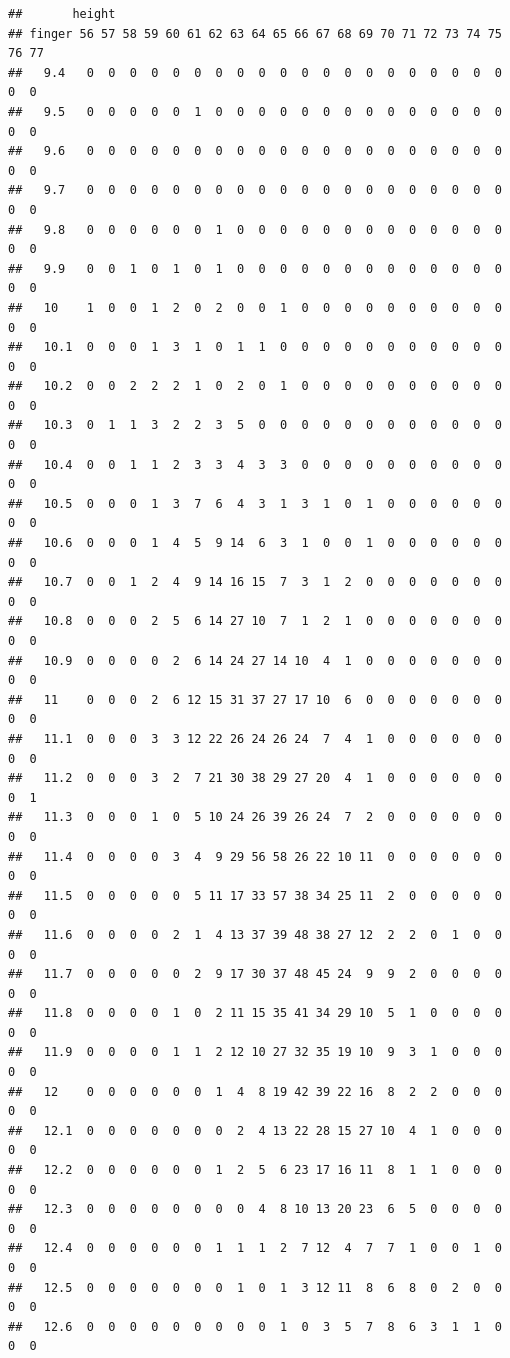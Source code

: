 \documentclass[
]{article}
\begin{document}
\begin{verbatim}
##       height
## finger 56 57 58 59 60 61 62 63 64 65 66 67 68 69 70 71 72 73 74 75 76 77
##   9.4   0  0  0  0  0  0  0  0  0  0  0  0  0  0  0  0  0  0  0  0  0  0
##   9.5   0  0  0  0  0  1  0  0  0  0  0  0  0  0  0  0  0  0  0  0  0  0
##   9.6   0  0  0  0  0  0  0  0  0  0  0  0  0  0  0  0  0  0  0  0  0  0
##   9.7   0  0  0  0  0  0  0  0  0  0  0  0  0  0  0  0  0  0  0  0  0  0
##   9.8   0  0  0  0  0  0  1  0  0  0  0  0  0  0  0  0  0  0  0  0  0  0
##   9.9   0  0  1  0  1  0  1  0  0  0  0  0  0  0  0  0  0  0  0  0  0  0
##   10    1  0  0  1  2  0  2  0  0  1  0  0  0  0  0  0  0  0  0  0  0  0
##   10.1  0  0  0  1  3  1  0  1  1  0  0  0  0  0  0  0  0  0  0  0  0  0
##   10.2  0  0  2  2  2  1  0  2  0  1  0  0  0  0  0  0  0  0  0  0  0  0
##   10.3  0  1  1  3  2  2  3  5  0  0  0  0  0  0  0  0  0  0  0  0  0  0
##   10.4  0  0  1  1  2  3  3  4  3  3  0  0  0  0  0  0  0  0  0  0  0  0
##   10.5  0  0  0  1  3  7  6  4  3  1  3  1  0  1  0  0  0  0  0  0  0  0
##   10.6  0  0  0  1  4  5  9 14  6  3  1  0  0  1  0  0  0  0  0  0  0  0
##   10.7  0  0  1  2  4  9 14 16 15  7  3  1  2  0  0  0  0  0  0  0  0  0
##   10.8  0  0  0  2  5  6 14 27 10  7  1  2  1  0  0  0  0  0  0  0  0  0
##   10.9  0  0  0  0  2  6 14 24 27 14 10  4  1  0  0  0  0  0  0  0  0  0
##   11    0  0  0  2  6 12 15 31 37 27 17 10  6  0  0  0  0  0  0  0  0  0
##   11.1  0  0  0  3  3 12 22 26 24 26 24  7  4  1  0  0  0  0  0  0  0  0
##   11.2  0  0  0  3  2  7 21 30 38 29 27 20  4  1  0  0  0  0  0  0  0  1
##   11.3  0  0  0  1  0  5 10 24 26 39 26 24  7  2  0  0  0  0  0  0  0  0
##   11.4  0  0  0  0  3  4  9 29 56 58 26 22 10 11  0  0  0  0  0  0  0  0
##   11.5  0  0  0  0  0  5 11 17 33 57 38 34 25 11  2  0  0  0  0  0  0  0
##   11.6  0  0  0  0  2  1  4 13 37 39 48 38 27 12  2  2  0  1  0  0  0  0
##   11.7  0  0  0  0  0  2  9 17 30 37 48 45 24  9  9  2  0  0  0  0  0  0
##   11.8  0  0  0  0  1  0  2 11 15 35 41 34 29 10  5  1  0  0  0  0  0  0
##   11.9  0  0  0  0  1  1  2 12 10 27 32 35 19 10  9  3  1  0  0  0  0  0
##   12    0  0  0  0  0  0  1  4  8 19 42 39 22 16  8  2  2  0  0  0  0  0
##   12.1  0  0  0  0  0  0  0  2  4 13 22 28 15 27 10  4  1  0  0  0  0  0
##   12.2  0  0  0  0  0  0  1  2  5  6 23 17 16 11  8  1  1  0  0  0  0  0
##   12.3  0  0  0  0  0  0  0  0  4  8 10 13 20 23  6  5  0  0  0  0  0  0
##   12.4  0  0  0  0  0  0  1  1  1  2  7 12  4  7  7  1  0  0  1  0  0  0
##   12.5  0  0  0  0  0  0  0  1  0  1  3 12 11  8  6  8  0  2  0  0  0  0
##   12.6  0  0  0  0  0  0  0  0  0  1  0  3  5  7  8  6  3  1  1  0  0  0

\end{verbatim}
\end{document}
